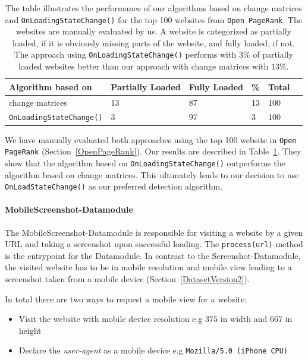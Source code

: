\begin{table}
	\centering
	\begin{tabularx}{\textwidth}{l l l l l l}
		Algorithm based on & Partially Loaded & Fully Loaded & \%  & Total \\ \hline \hline
		change matrices & 13 & 87 & 13 & 100 \\ \hline
		\texttt{OnLoadingStateChange()} & 3 &  97 & 3 & 100
	\end{tabularx}
	\caption[Performance of algorithms for detecting website loading completion]{The table illustrates the performance of our algorithms based on change matrices and \texttt{OnLoadingStateChange()} for the top 100 websites from \texttt{Open PageRank}. The websites are manually evaluated by us. A website is categorized as partially loaded, if it is obviously missing parts of the website, and fully loaded, if not. The approach using \texttt{OnLoadingStateChange()} performs with $3\%$ of partially loaded websites better than our approach with change matrices with $13\%$. }
	\label{table_compare_algorithm_screenshot}
\end{table}

We have manually evaluated both approaches using the top 100 website in \texttt{Open PageRank} (Section~\ref{OpenPageRank}). Our results are described in Table~\ref{table_compare_algorithm_screenshot}. They show that the algorithm based on \texttt{OnLoadingStateChange()} outperforms the algorithm based on change matrices. This ultimately leads to our decision to use \texttt{OnLoadStateChange()} as our preferred detection algorithm.

\paragraph*{MobileScreenshot-Datamodule}
\label{datacrawler_mobilescreenshot_datamodule}
The MobileScreenshot-Datamodule is responsible for visiting a website by a given URL and taking a screenshot upon successful loading. The \texttt{process(url)}-method is the entrypoint for the Datamodule. In contrast to the Screenshot-Datamodule, the visited website has to be in mobile resolution and mobile view leading to a screenshot taken from a mobile device (Section~\ref{DatasetVersion2}).

In total there are two ways to request a mobile view for a website:

\begin{itemize}
	\item Visit the website with mobile device resolution e.g $375$ in width and $667$ in height
	\item Declare the \textit{user-agent} as a mobile device e.g  \texttt{Mozilla/5.0 (iPhone CPU)}
\end{itemize}

